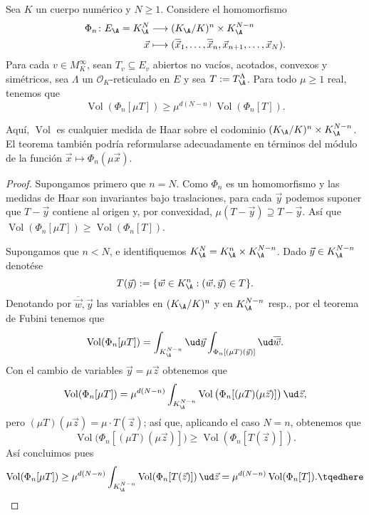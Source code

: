 \documentclass[teoria-numeros.tex]{subfiles}
\begin{document}
\newcommand{\Vol}{\operatorname{Vol}}
\begin{lem}
	Sea $K$ un cuerpo numérico y $N \ge 1$.
	Considere el homomorfismo
	\begin{align*}
		\Phi_n \colon E_\A = K_\A^N &\longrightarrow (K_\A/K)^n \times K_\A^{N-n} \\
		\vec x &\longmapsto (\overline{\vec x}_1, \dots, \overline{\vec x}_n, \vec x_{n+1}, \dots, \vec x_N).
	\end{align*}
	Para cada $v \in M_K^\infty$, sean $T_v \subseteq E_v$ abiertos no vacíos, acotados, convexos y simétricos,
	sea $\Lambda$ un $\mathcal{O}_K$-reticulado en $E$ y sea $T := T_\A^\Lambda$.
	Para todo $\mu \ge 1$ real, tenemos que
	\[
		\Vol( \Phi_n[\mu T] ) \ge \mu^{d(N - n)} \Vol( \Phi_n[T] ).
	\]
\end{lem}
Aquí, $\Vol$ es cualquier medida de Haar sobre el codominio $(K_\A/K)^n \times K_\A^{N-n}$.
El teorema también podría reformularse adecuadamente en términos del módulo de la función $\vec x \mapsto \Phi_n(\mu\vec x)$.
\begin{proof}
	Supongamos primero que $n = N$.
	Como $\Phi_n$ es un homomorfismo y las medidas de Haar son invariantes bajo traslaciones,
	para cada $\vec y$ podemos suponer que $T - \vec y$ contiene al origen y, por convexidad, $\mu(T - \vec y) \supseteq T - \vec y$.
	Así que $\Vol( \Phi_n[\mu T] ) \ge \Vol( \Phi_n[T] )$.

	Supongamos que $n < N$, e identifiquemos $K_\A^N = K_\A^n \times K_\A^{N-n}$.
	Dado $\vec y \in K_\A^{N-n}$ denotése
	$$ T(\vec y) := \{ \vec w \in K_\A^n : (\vec w, \vec y) \in T \}. $$
	Denotando por $\overline{\vec w}, \vec y$ las variables en $(K_\A/K)^n$ y en $K_\A^{N-n}$ resp., por el teorema de Fubini tenemos que
	$$ \Vol(\Phi_n[\mu T]) = \int_{K_\A^{N-n}} \ud\vec y \int_{\Phi_n[(\mu T)(\vec y)]} \ud\overline{\vec w}. $$
	Con el cambio de variables $\vec y = \mu\vec z$ obtenemos que
	$$ \Vol(\Phi_n[\mu T]) = \mu^{d(N-n)}\int_{K_\A^{N-n}} \Vol\big( \Phi_n[(\mu T)(\mu\vec z)] \big) \, \ud\vec z, $$
	pero $(\mu T)(\mu\vec z) = \mu\cdot T(\vec z)$; así que, aplicando el caso $N = n$, obtenemos que
	$$ \Vol\big( \Phi_n[(\mu T)(\mu\vec z)] \big) \ge \Vol( \Phi_n[T(\vec z)] ). $$
	Así concluimos pues
	\begin{equation}
		\Vol(\Phi_n[\mu T]) \ge \mu^{d(N - n)} \int_{K_\A^{N-n}} \Vol( \Phi_n[T(\vec z)] ) \, \ud\vec z = \mu^{d(N-n)} \Vol( \Phi_n[T] ).
		\tqedhere
	\end{equation}
\end{proof}
\end{document}

